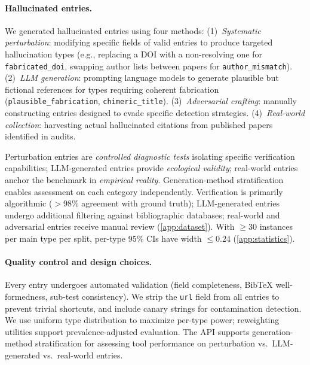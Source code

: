 \paragraph{Hallucinated entries.}
We generated hallucinated entries using four methods:
(1)~\emph{Systematic perturbation}: modifying specific fields of valid entries to produce targeted hallucination types (e.g., replacing a DOI with a non-resolving one for \texttt{fabricated\_doi}, swapping author lists between papers for \texttt{author\_mismatch}).
(2)~\emph{LLM generation}: prompting language models to generate plausible but fictional references for types requiring coherent fabrication (\texttt{plausible\_fabrication}, \texttt{chimeric\_title}).
(3)~\emph{Adversarial crafting}: manually constructing entries designed to evade specific detection strategies.
(4)~\emph{Real-world collection}: harvesting actual hallucinated citations from published papers identified in audits.

Perturbation entries are \emph{controlled diagnostic tests} isolating specific verification capabilities; LLM-generated entries provide \emph{ecological validity}; real-world entries anchor the benchmark in \emph{empirical reality}.
Generation-method stratification enables assessment on each category independently.
Verification is primarily algorithmic ($>$98\% agreement with ground truth); LLM-generated entries undergo additional filtering against bibliographic databases; real-world and adversarial entries receive manual review (\cref{app:dataset}).
With $\geq 30$ instances per main type per split, per-type 95\% CIs have width $\leq 0.24$ (\cref{app:statistics}).

\paragraph{Quality control and design choices.}
Every entry undergoes automated validation (field completeness, BibTeX well-formedness, sub-test consistency).
We strip the \texttt{url} field from all entries to prevent trivial shortcuts, and include canary strings for contamination detection.
We use uniform type distribution to maximize per-type power; reweighting utilities support prevalence-adjusted evaluation.
The API supports generation-method stratification for assessing tool performance on perturbation vs.\ LLM-generated vs.\ real-world entries.

